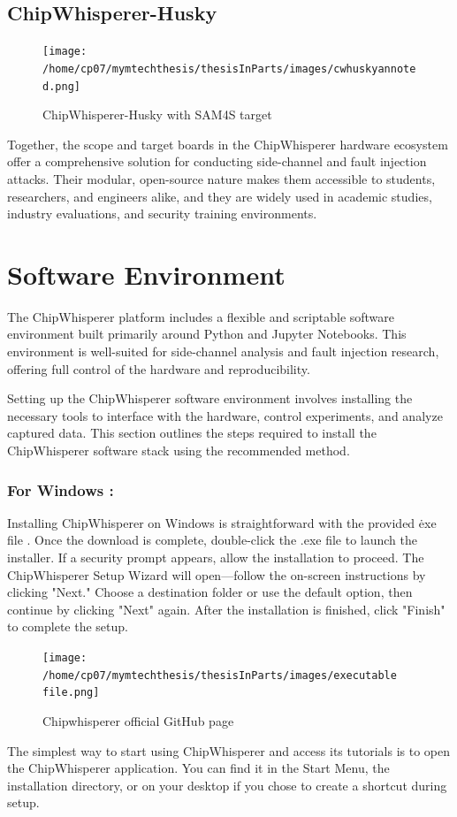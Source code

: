 \subsection{ChipWhisperer-Husky}
\begin{figure}[h]
    \centering
    \texttt{[image: /home/cp07/mymtechthesis/thesisInParts/images/cwhuskyannoted.png]}
    \caption{ChipWhisperer-Husky with SAM4S target}
    \label{fig:husky_target}
\end{figure}
Together, the scope and target boards in the ChipWhisperer hardware ecosystem offer a comprehensive solution for conducting side-channel and fault injection attacks. Their modular, open-source nature makes them accessible to students, researchers, and engineers alike, and they are widely used in academic studies, industry evaluations, and security training environments.

\section{Software Environment}
The ChipWhisperer platform includes a flexible and scriptable software environment built primarily around Python and Jupyter Notebooks. This environment is well-suited for side-channel analysis and fault injection research, offering full control of the hardware and reproducibility. 

 Setting up the ChipWhisperer software environment involves installing the necessary tools to interface with the hardware, control experiments, and analyze captured data. This section outlines the steps required to install the ChipWhisperer software stack using the recommended method.
\subsubsection{For Windows :}
Installing ChipWhisperer on Windows is straightforward with the provided \.exe file \cite{chipwhisperer2025}. Once the download is complete, double-click the .exe file to launch the installer. If a security prompt appears, allow the installation to proceed. The ChipWhisperer Setup Wizard will open—follow the on-screen instructions by clicking "Next." Choose a destination folder or use the default option, then continue by clicking "Next" again. After the installation is finished, click "Finish" to complete the setup.
\begin{figure}[h]
    \centering
    \texttt{[image: /home/cp07/mymtechthesis/thesisInParts/images/executable file.png]}
    \caption{Chipwhisperer official GitHub page}
    \label{fig:windows_installation}
\end{figure}
The simplest way to start using ChipWhisperer and access its tutorials is to open the ChipWhisperer application. You can find it in the Start Menu, the installation directory, or on your desktop if you chose to create a shortcut during setup.

